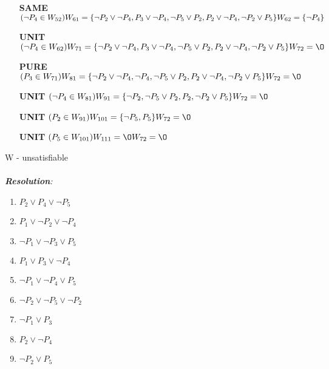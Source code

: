 \documentclass[a4paper,12pt]{article}
\begin{document}
\begin{enumerate}
\begin{itemize}
		\item [\textbf{SAME}] $(\neg P_4\in W_{52})\\W_{61} = \{\neg P_2 \lor  \neg P_4, P_3 \lor  \neg P_4, \neg P_5\lor P_2, P_2 \lor  \neg P_4, \neg P_2 \lor P_5\}\\W_{62} = \{ \neg P_4\}$
		\item [\textbf{UNIT}] $(\neg P_4\in W_{62})\\W_{71} = \{\neg P_2 \lor  \neg P_4, P_3 \lor  \neg P_4, \neg P_5\lor P_2, P_2 \lor  \neg P_4, \neg P_2 \lor P_5\}\\W_{72} = \O $
		\item [\textbf{PURE}] $(P_3\in W_{71})\\W_{81} = \{\neg P_2 \lor  \neg P_4,\neg P_4, \neg P_5\lor P_2, P_2 \lor  \neg P_4, \neg P_2 \lor P_5\}\\W_{72} = \O $
		\item [\textbf{UNIT}] $(\neg P_4\in W_{81})\\W_{91} = \{\neg P_2 , \neg P_5\lor P_2, P_2,  \neg P_2 \lor P_5\}\\W_{72} = \O $
		\item [\textbf{UNIT}] $( P_2\in W_{91})\\W_{101} = \{\neg P_5,P_5\}\\W_{72} = \O $
		\item [\textbf{UNIT}] $( P_5\in W_{101})\\W_{111} = \O\\W_{72} = \O $
	\end{itemize}W - unsatisfiable
	\\\\\emph{\textbf{Resolution}:}\\
	\begin{multicols}{3}
		\begin{enumerate}[(1)] 
			\item $P_2 \lor P_4 \lor  \neg P_5$
			\item $P_1 \lor  \neg P_2 \lor  \neg P_4$
			\item $\neg P_1 \lor  \neg P_3 \lor P_5$
			\item $ P_1 \lor P_3 \lor  \neg P_4$
			\item $\neg P_1 \lor  \neg P_4 \lor P_5$
			\item $\neg P_2 \lor  \neg P_5 \lor  \neg P_2$
			\item $\neg P_1 \lor  P_3$
			\item $P_2 \lor  \neg P_4$
			\item $\neg P_2 \lor P_5$
		\end{enumerate}

\end{multicols}
\end{enumerate}
\end{document}

